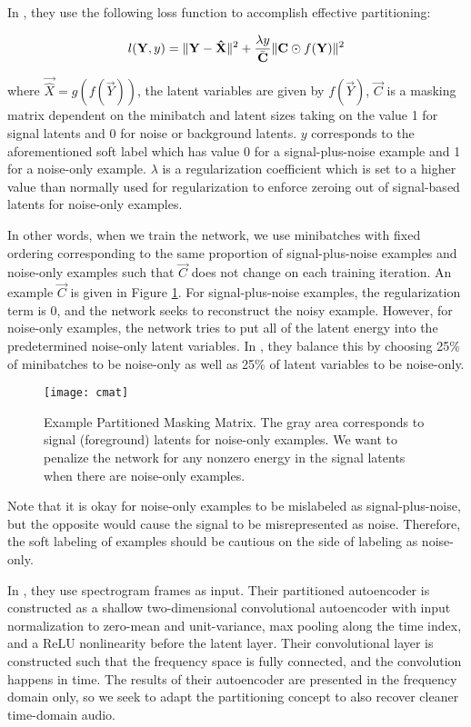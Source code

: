 In \cite{stow}, they use the following loss function to accomplish effective partitioning:

\begin{equation}\label{eq:stowloss}
l(\mathbf{Y}, y) = \lVert \mathbf{Y} - \mathbf{\hat{X}}\rVert^{2} + \dfrac{\lambda y}{\bar{\mathbf{C}}} \lVert\mathbf{C} \odot f(\mathbf{Y})\rVert^{2}
\end{equation}

where $\vec{\hat{X}}=g(f(\vec{Y}))$, the latent variables are given by $f(\vec{Y})$, $\vec{C}$ is a masking matrix dependent on the minibatch and latent sizes taking on the value 1 for signal latents and 0 for noise or background latents. $y$ corresponds to the aforementioned soft label which has value 0 for a signal-plus-noise example and 1 for a noise-only example. $\lambda$ is a regularization coefficient which is set to a higher value than normally used for regularization to enforce zeroing out of signal-based latents for noise-only examples.

In other words, when we train the network, we use minibatches with fixed ordering corresponding to the same proportion of signal-plus-noise examples and noise-only examples such that $\vec{C}$ does not change on each training iteration. An example $\vec{C}$ is given in Figure \ref{fig:cmat}. For signal-plus-noise examples, the regularization term is 0, and the network seeks to reconstruct the noisy example. However, for noise-only examples, the network tries to put all of the latent energy into the predetermined noise-only latent variables. In \cite{stow}, they balance this by choosing 25\% of minibatches to be noise-only as well as 25\% of latent variables to be noise-only.

\begin{figure}[!ht]
\centering
\texttt{[image: cmat]}
\caption[Example Partitioned Masking Matrix]{Example Partitioned Masking Matrix. \cite{stow} The gray area corresponds to signal (foreground) latents for noise-only examples. We want to penalize the network for any nonzero energy in the signal latents when there are noise-only examples.}
\label{fig:cmat}
\end{figure}

Note that it is okay for noise-only examples to be mislabeled as signal-plus-noise, but the opposite would cause the signal to be misrepresented as noise. Therefore, the soft labeling of examples should be cautious on the side of labeling as noise-only.

In \cite{stow}, they use spectrogram frames as input. Their partitioned autoencoder is constructed as a shallow two-dimensional convolutional autoencoder with input normalization to zero-mean and unit-variance, max pooling along the time index, and a ReLU nonlinearity before the latent layer. Their convolutional layer is constructed such that the frequency space is fully connected, and the convolution happens in time. The results of their autoencoder are presented in the frequency domain only, so we seek to adapt the partitioning concept to also recover cleaner time-domain audio.

